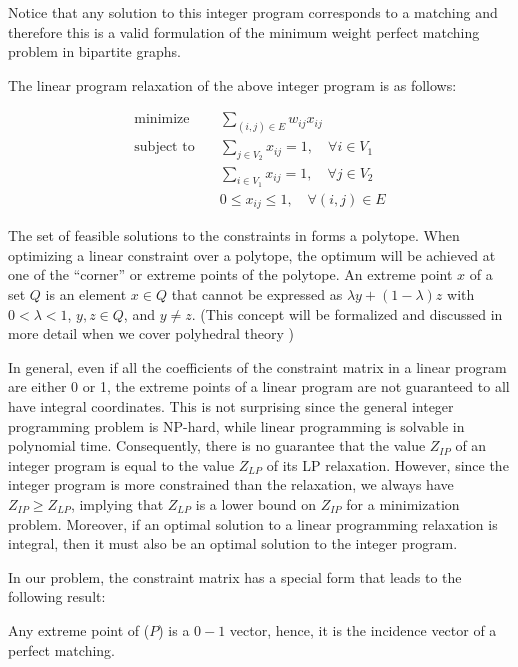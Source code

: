 Notice that any solution to this integer program corresponds to a matching and therefore this is a valid formulation of the minimum weight perfect matching problem in bipartite graphs.

The linear program relaxation of the above integer program is as follows:

\begin{equation}
    \begin{aligned}
        \text{minimize} \quad & \sum_{(i, j) \in E} w_{ij} x_{ij} \\
        \text{subject to} \quad & \sum_{j \in V_2} x_{ij} = 1, \quad \forall i \in V_1 \\
        & \sum_{i \in V_1} x_{ij} = 1, \quad \forall j \in V_2 \\
        & 0 \leq x_{ij} \leq 1, \quad \forall (i, j) \in E
    \end{aligned}
\end{equation}

The set of feasible solutions to the constraints in   forms a polytope. When optimizing a linear constraint over a polytope, the optimum will be achieved at one of the ``corner'' or extreme points of the polytope. An extreme point $x$ of a set $Q$ is an element $x \in Q$ that cannot be expressed as $\lambda y + (1 - \lambda) z$ with $0 < \lambda < 1$, $y, z \in Q$, and $y \neq z$. (This concept will be formalized and discussed in more detail when we cover polyhedral theory )

In general, even if all the coefficients of the constraint matrix in a linear program are either 0 or 1, the extreme points of a linear program are not guaranteed to all have integral coordinates. This is not surprising since the general integer programming problem is NP-hard, while linear programming is solvable in polynomial time. Consequently, there is no guarantee that the value $Z_{IP}$ of an integer program is equal to the value $Z_{LP}$ of its LP relaxation. However, since the integer program is more constrained than the relaxation, we always have $Z_{IP} \geq Z_{LP}$, implying that $Z_{LP}$ is a lower bound on $Z_{IP}$ for a minimization problem. Moreover, if an optimal solution to a linear programming relaxation is integral, then it must also be an optimal solution to the integer program.

In our problem, the constraint matrix has a special form that leads to the following result: 

\begin{theorem}
    Any extreme point of ($P$) is a $0-1$ vector, hence, it is the incidence vector of a perfect matching.
\end{theorem}

